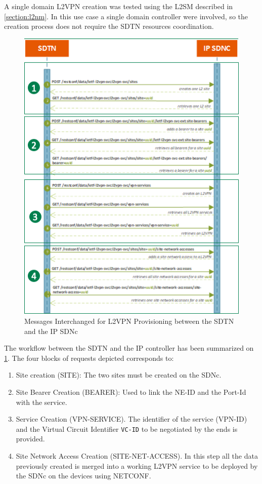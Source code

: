 \documentclass[a4paper,fleqn]{cas-dc}
\begin{document}
A single domain L2VPN creation was tested using the L2SM described in \ref{section:l2nm}. In this use case a single domain controller were involved, so the creation process does not require the SDTN resources coordination.  

\begin{figure}
	\centering
		\includegraphics[width=\linewidth]{figs/l2sm_workflow_3.png}
	\caption{Messages Interchanged for L2VPN Provisioning between the SDTN and the IP SDNc}
	\label{FIG:L2SM_workflow}
\end{figure}

The workflow between the SDTN and the IP controller has been summarized on \cref{FIG:L2SM_workflow}. The four blocks of requests depicted corresponds to: 

\begin{enumerate}
    \item Site creation (SITE): The two sites must be created on the SDNc.
    \item Site Bearer Creation (BEARER): Used to link the NE-ID and the Port-Id with the service.
    \item Service Creation (VPN-SERVICE). The identifier of the service (VPN-ID) and the Virtual Circuit Identifier \texttt{VC-ID} to be negotiated by the ends is provided.  
    \item Site Network Access Creation (SITE-NET-ACCESS). In this step all the data previously created is merged into a working L2VPN service to be deployed by the SDNc on the devices using NETCONF.
\end{enumerate}
\end{document}

